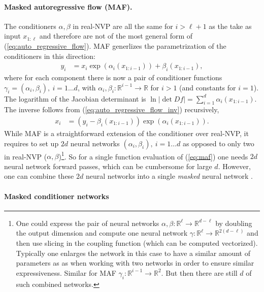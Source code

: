 \documentclass[12pt,a4paper]{article}
\begin{document}
\paragraph{Masked autoregressive flow (MAF)\cite{papamakarios_2017_maf}.}  The conditioners $\alpha, \beta$ in real-NVP are all the same for $i > \ell + 1$ as the take as input $x_{1:\ell}$ and therefore are not of the most general form of (\ref{eq:auto_regressive_flow}). MAF generlizes the parametrization of the conditioners in this direction:
\begin{align} \label{eq:real_nvp}
y_{i} &= x_i \exp(\alpha_i(x_{1:i-1})) + \beta_i(x_{1:i-1}),
\end{align}
where for each component there is now a pair of conditioner functions $\gamma_i=(\alpha_i, \beta_i), ~ i=1\dots d$, with  $\alpha_i, \beta_i: \mathbb{R}^{i-1} \rightarrow \mathbb{R}$ for $i>1$ (and  constants for $i=1$). The logarithm of the Jacobian determinant is $\ln |\det Df| = \sum_{i=1}^d\alpha_i(x_{1:i-1})$. The inverse follows from 
(\ref{eq:auto_regressive_flow_inv}) recursively, 
\begin{align} \label{eq:maf}
	x_{i} &= (y_i -  \beta_i(x_{1:i-1})) \exp(\alpha_i(x_{1:i-1})). 
\end{align}
While MAF is a straightforward extension of the conditioner over real-NVP, it requires to set up $2d$ neural networks $(\alpha_i, \beta_i), ~ i=1\dots d$ as opposed to only two in real-NVP ($\alpha, \beta$)\footnote{One could express the pair of neural networks $\alpha, \beta: \mathbb{R}^\ell \rightarrow \mathbb{R}^{d - \ell}$ by doubling the output dimension and compute one neural network $\gamma: \mathbb{R}^\ell \rightarrow \mathbb{R}^{2(d - \ell)}$ and then use slicing in the coupling function (which can be computed vectorized). Typically one enlarges the network in this case to have a similar amount of parameters as as when working with two networks in order to ensure similar expressiveness. Similar for MAF $\gamma_i: \mathbb{R}^{i-1} \rightarrow \mathbb{R}^{2}$. But then there are still $d$ of such combined networks.}. So for a single function evaluation of (\ref{eq:maf}) one needs $2d$ neural network forward passes, which can be cumbersome for large $d$.  However, one can combine these $2d$ neural networks into a single \textit{masked} neural network \cite{germain_2015_made}.

\paragraph{Masked conditioner networks}
 
\end{document}

